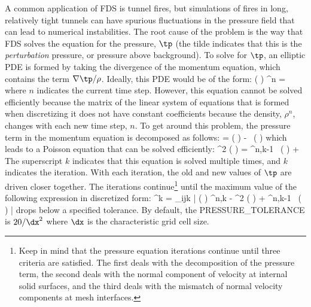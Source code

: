 \documentclass[11pt]{book}
\begin{document}
A common application of FDS is tunnel fires, but simulations of fires in long, relatively tight tunnels can have spurious fluctuations in the pressure field that can lead to numerical instabilities. The root cause of the problem is the way that FDS solves the equation for the pressure, $\tp$ (the tilde indicates that this is the {\em perturbation} pressure, or pressure above background). To solve for $\tp$, an elliptic PDE is formed by taking the divergence of the momentum equation, which contains the term $\nabla \tp / \rho$. Ideally, this PDE would be of the form:
\be
   \nabla \cdot \left(  \right) \nabla \tp^{n} = \; \cdots
\ee
where $n$ indicates the current time step. However, this equation cannot be solved efficiently because the matrix of the linear system of equations that is formed when discretizing it does not have constant coefficients because the density, $\rho^n$, changes with each new time step, $n$. To get around this problem, the pressure term in the momentum equation is decomposed as follows:
\be
    \nabla \tp = \nabla \left( \frac{\tp}{\rho}\right) - \tp \, \nabla \left( \right) \label{p_decomp}
\ee
which leads to a Poisson equation that can be solved efficiently:
\be
   \nabla^2 \left(  \right) = \nabla \cdot \tp^{n,k-1} \, \nabla \left( \right) + \; \cdots
\ee
The superscript $k$ indicates that this equation is solved multiple times, and $k$ indicates the iteration. With each iteration, the old and new values of $\tp$ are driven closer together. The iterations continue\footnote{Keep in mind that the pressure equation iterations continue until three criteria are satisfied. The first deals with the decomposition of the pressure term, the second deals with the normal component of velocity at internal solid surfaces, and the third deals with the mismatch of normal velocity components at mesh interfaces.} until the maximum value of the following expression in discretized form:
\be
  \epsilon^k = \max_{ijk} \left| \nabla \cdot \left(  \right) \nabla \tp^{n,k} - \nabla^2 \left(  \right) + \nabla \cdot \tp^{n,k-1} \, \nabla \left( \right) \right|
\ee
drops below a specified tolerance. By default, the {\ct PRESSURE\_TOLERANCE} is $20/\dx^2$ where $\dx$ is the characteristic grid cell size.
\end{document}
